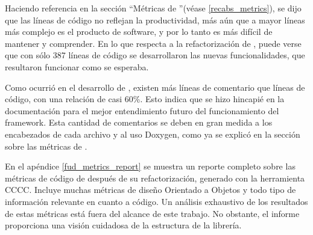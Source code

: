 Haciendo referencia en la sección ``Métricas de \rc''(véase \ref{recabs_metrics}), se dijo que las líneas de código no reflejan la
productividad, más aún que a mayor líneas más complejo es el producto de software, y por lo tanto es más difícil de mantener y comprender.
En lo que respecta a la refactorización de \fud, puede verse que con sólo 387 líneas de código se desarrollaron las nuevas funcionalidades,
que resultaron funcionar como se esperaba.

Como ocurrió en el desarrollo de \rc, existen más líneas de comentario que líneas de código, con una relación de casi 60\%. Esto indica que
se hizo hincapié en la documentación para el mejor entendimiento futuro del funcionamiento del framework. Esta cantidad de comentarios se
deben en gran medida a los encabezados de cada archivo y al uso Doxygen, como ya se explicó en la sección sobre las métricas de \rc.

En el apéndice \ref{fud_metrics_report} se muestra un reporte completo sobre las métricas de código de \fud{} después de su
refactorización, generado con la herramienta CCCC. Incluye muchas métricas de diseño Orientado a Objetos y todo tipo de información
relevante en cuanto a código. Un análisis exhaustivo de los resultados de estas métricas está fuera del alcance de este trabajo. No
obstante, el informe proporciona una visión cuidadosa de la estructura de la librería.
